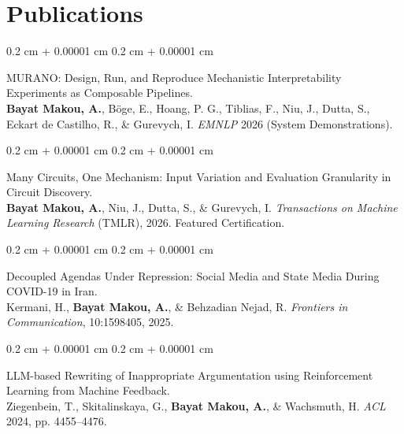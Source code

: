 \documentclass[10pt, letterpaper]{article}
\newenvironment{onecolentry}{
    \begin{adjustwidth}{
        0.2 cm + 0.00001 cm
    }{
        0.2 cm + 0.00001 cm
    }
}{
    \end{adjustwidth}
} %
\let\hrefWithoutArrow\href
\renewcommand{\href}[2]{\hrefWithoutArrow{#1}{\mbox{\ifthenelse{\equal{#2}{}}{ }{#2 }\raisebox{.15ex}{\footnotesize \faExternalLink*}}}}
\begin{document}
    \section{Publications}
        \begin{samepage}
            \begin{onecolentry}
                MURANO: Design, Run, and Reproduce Mechanistic Interpretability Experiments as Composable Pipelines.\\
                {\small \textbf{Bayat Makou, A.}, B\"{o}ge, E., Hoang, P. G., Tiblias, F., Niu, J., Dutta, S., Eckart de Castilho, R., \& Gurevych, I. \textit{EMNLP} 2026 (System Demonstrations). \href{https://arxiv.org/abs/2608.30662}{[paper]}}
            \end{onecolentry}
            \vspace{0.4em}
            \begin{onecolentry}
                Many Circuits, One Mechanism: Input Variation and Evaluation Granularity in Circuit Discovery.\\
                {\small \textbf{Bayat Makou, A.}, Niu, J., Dutta, S., \& Gurevych, I. \textit{Transactions on Machine Learning Research} (TMLR), 2026. Featured Certification. \href{https://openreview.net/forum?id=Ur42Xx1QPv}{[paper]}}
            \end{onecolentry}
            \vspace{0.4em}
            \begin{onecolentry}
                Decoupled Agendas Under Repression: Social Media and State Media During \mbox{COVID-19} in Iran.\\
                {\small Kermani, H., \textbf{Bayat Makou, A.}, \& Behzadian Nejad, R. \textit{Frontiers in Communication}, 10:1598405, 2025. \href{https://www.frontiersin.org/journals/communication/articles/10.3389/fcomm.2025.1598405/full}{[paper]}}
            \end{onecolentry}
            \vspace{0.4em}
            \begin{onecolentry}
                LLM-based Rewriting of Inappropriate Argumentation using Reinforcement Learning from Machine Feedback.\\
                {\small Ziegenbein, T., Skitalinskaya, G., \textbf{Bayat Makou, A.}, \& Wachsmuth, H. \textit{ACL} 2024, pp. 4455--4476. \href{https://aclanthology.org/2024.acl-long.244/}{[paper]}}
            \end{onecolentry}
            \vspace{0.4em}

\end{samepage}
\end{document}
